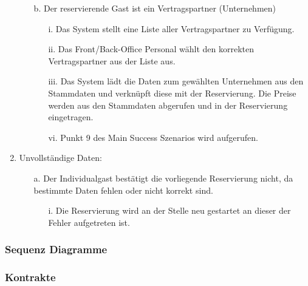 \documentclass[./detailed_overview_usecases.tex]{subfiles}
\begin{document}
\begin{enumerate}
\begin{itemize}
            \item[b.] Der reservierende Gast ist ein Vertragspartner (Unternehmen)
                \begin{itemize}
                    \item[i.] Das System stellt eine Liste aller Vertragspartner zu Verfügung.
                    \item[ii.] Das Front/Back-Office Personal wählt den korrekten Vertragspartner aus der Liste aus.
                    \item[iii.] Das System lädt die Daten zum gewählten Unternehmen aus den Stammdaten und verknüpft diese mit der Reservierung. Die Preise
                    werden aus den Stammdaten abgerufen und in der Reservierung eingetragen.
                    \item[vi.] Punkt 9 des Main Success Szenarios wird aufgerufen.
                \end{itemize}
        \end{itemize}
        \setcounter{enumi}{8}
        \item Unvollständige Daten: \begin{itemize}
                                        \item[a.] Der Individualgast bestätigt die vorliegende Reservierung nicht, da bestimmte Daten fehlen oder nicht korrekt sind.
                                        \begin{itemize}
                                            \item[i.] Die Reservierung wird an der Stelle neu gestartet an dieser der Fehler aufgetreten ist.
                                        \end{itemize}
                                    \end{itemize}
    \end{enumerate}

    \subsubsection{Sequenz Diagramme}
    \subsubsection{Kontrakte}
\end{document}
